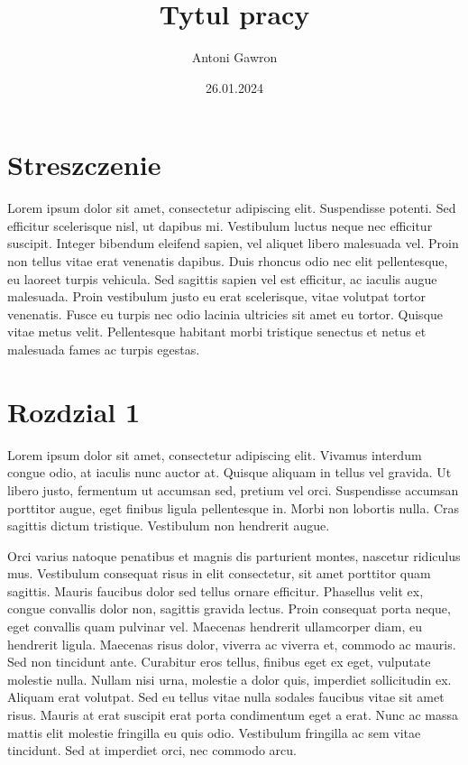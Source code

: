 \documentclass[12pt]{article}
\title{Tytul pracy}
\author{Antoni Gawron}
\date{26.01.2024}
\begin{document}
\maketitle

\begin{frame}{}
    \tableofcontents
\end{frame}
\listoftables 
\listoffigures


\section*{Streszczenie}
Lorem ipsum dolor sit amet, consectetur adipiscing elit. Suspendisse potenti. Sed efficitur scelerisque nisl, ut dapibus mi. Vestibulum luctus neque nec efficitur suscipit. Integer bibendum eleifend sapien, vel aliquet libero malesuada vel. Proin non tellus vitae erat venenatis dapibus. Duis rhoncus odio nec elit pellentesque, eu laoreet turpis vehicula. Sed sagittis sapien vel est efficitur, ac iaculis augue malesuada. Proin vestibulum justo eu erat scelerisque, vitae volutpat tortor venenatis. Fusce eu turpis nec odio lacinia ultricies sit amet eu tortor. Quisque vitae metus velit. Pellentesque habitant morbi tristique senectus et netus et malesuada fames ac turpis egestas.


\section*{Rozdzial 1}
Lorem ipsum dolor sit amet, consectetur adipiscing elit. Vivamus interdum congue odio, at iaculis nunc auctor at. Quisque aliquam in tellus vel gravida. Ut libero justo, fermentum ut accumsan sed, pretium vel orci. Suspendisse accumsan porttitor augue, eget finibus ligula pellentesque in. Morbi non lobortis nulla. Cras sagittis dictum tristique. Vestibulum non hendrerit augue. 

Orci varius natoque penatibus et magnis dis parturient montes, nascetur ridiculus mus. Vestibulum consequat risus in elit consectetur, sit amet porttitor quam sagittis. Mauris faucibus dolor sed tellus ornare efficitur. Phasellus velit ex, congue convallis dolor non, sagittis gravida lectus. Proin consequat porta neque, eget convallis quam pulvinar vel. Maecenas hendrerit ullamcorper diam, eu hendrerit ligula. Maecenas risus dolor, viverra ac viverra et, commodo ac mauris. Sed non tincidunt ante. Curabitur eros tellus, finibus eget ex eget, vulputate molestie nulla. Nullam nisi urna, molestie a dolor quis, imperdiet sollicitudin ex. Aliquam erat volutpat. Sed eu tellus vitae nulla sodales faucibus vitae sit amet risus. Mauris at erat suscipit erat porta condimentum eget a erat. Nunc ac massa mattis elit molestie fringilla eu quis odio. Vestibulum fringilla ac sem vitae tincidunt. Sed at imperdiet orci, nec commodo arcu. 
\end{document}
